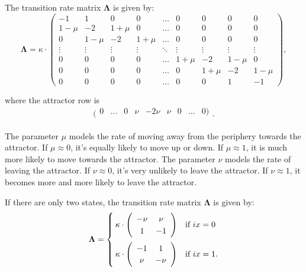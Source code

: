 \documentclass[a4paper,11pt]{article}
\def\bLambda{\boldsymbol{\Lambda}}
\begin{document}
The transition rate matrix $\bLambda$ is given by:
\begin{equation*}
    \bLambda = \kappa \cdot \left(\begin{array}{ccccccccc}
    -1 & 1 & 0 & 0 & \dots & 0 & 0 & 0 & 0\\
    1-\mu & -2 & 1+\mu & 0 & \dots & 0 & 0 & 0 & 0\\
     0  & 1-\mu & -2 & 1+\mu & \dots & 0 & 0 & 0 & 0\\
    \vdots & \vdots & \vdots & \vdots & \ddots & \vdots & \vdots & \vdots & \vdots\\
    0 & 0 & 0 & 0 & \dots & 1+\mu & -2 & 1-\mu & 0\\
    0 & 0 & 0 & 0 & \dots & 0 & 1+\mu & -2 & 1-\mu\\
    0 & 0 & 0 & 0 & \dots & 0 & 0 & 1 & -1
    \end{array}\right),
    \end{equation*}

where the attractor row is
    \begin{equation*}
    (\begin{array}{ccccccccc}
     0  & \ldots & 0 & \nu & -2\nu & \nu & 0 & \ldots & 0)\\
    \end{array}.
    \end{equation*}

The parameter $\mu$ models the rate of moving away from the periphery towards the attractor. If $\mu \approx 0$, it's equally likely to move up or down. If $\mu \approx 1$, it is much more likely to move towards the attractor.
The parameter $\nu$ models the rate of leaving the attractor. If $\nu \approx 0$, it's very unlikely to leave the attractor. If $\nu \approx 1$, it becomes more and more likely to leave the attractor.

If there are only two states, the transition rate matrix $\bLambda$ is given by:
    \begin{equation*}
    \bLambda = \begin{cases}
    \kappa \cdot  \left(\begin{array}{cc}
    -\nu & \nu \\
    1 & -1
    \end{array}\right)  & \mbox{if } ix = 0 \vspace{0.2cm}\\

    \kappa \cdot  \left(\begin{array}{cc}
    -1 & 1 \\
    \nu & -\nu
    \end{array}\right) & \mbox{if } ix = 1.
    \end{cases}
    \end{equation*}
\end{document}
